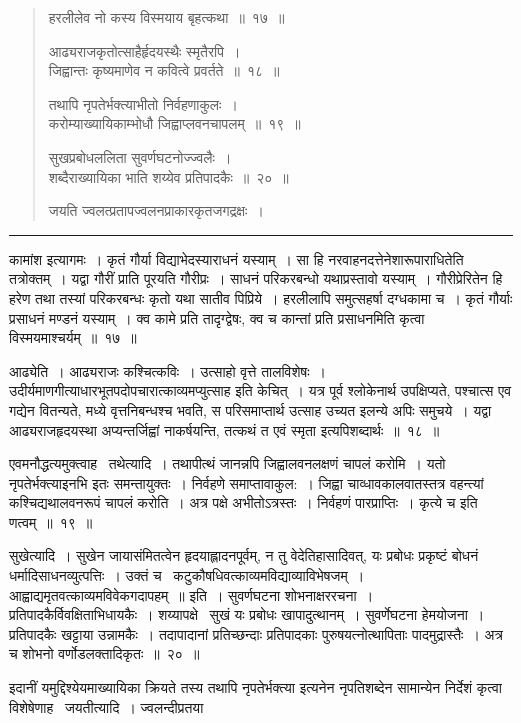 \documentclass[11pt, openany]{book}
\begin{document}
\newpage

\begin{quote}
{\ha हरलीलेव नो कस्य विस्मयाय बृहत्कथा~॥~१७~॥

आढ्यराजकृतोत्साहैर्हृदयस्थैः स्मृतैरपि~।\\
जिह्वान्तः कृष्यमाणेव न कवित्वे प्रवर्तते~॥~१८~॥

तथापि नृपतेर्भक्त्याभीतो निर्वहणाकुलः~।\\
करोम्याख्यायिकाम्भोधौ जिह्वाप्लवनचापलम्~॥~१९~॥

सुखप्रबोधललिता सुवर्णघटनोज्ज्वलैः~।\\
शब्दैराख्यायिका भाति शय्येव प्रतिपादकैः~॥~२०~॥

जयति ज्वलत्प्रतापज्वलनप्राकारकृतजगद्रक्षः~।}
\end{quote}

\hrule

\noindent
{\s कामांश इत्यागमः~। कृतं गौर्या विद्याभेदस्याराधनं यस्याम्~। सा हि नरवाहनदत्तेनेशारूपाराधितेति तत्रोक्तम्~। यद्वा गौरीं प्राति पूरयति गौरीप्रः~। साधनं परिकरबन्धो यथाप्रस्तावो यस्याम्~। गौरीप्रेरितेन हि हरेण तथा तस्यां परिकरबन्धः कृतो यथा सातीव पिप्रिये~। हरलीलापि समुत्सहर्षा दग्धकामा च~। कृतं गौर्याः प्रसाधनं मण्डनं यस्याम्~। क्व कामे प्रति तादृग्द्वेषः, क्व च कान्तां प्रति प्रसाधनमिति कृत्वा विस्मयमाश्चर्यम्~॥~१७~॥

{\qtt आढ्येति}~। आढ्यराजः कश्चित्कविः~। उत्साहो वृत्ते तालविशेषः~। उदीर्यमाणगीत्याधारभूतपदोपचारात्काव्यमप्युत्साह इति केचित्~। यत्र पूर्व श्लोकेनार्थ उपक्षिप्यते, पश्चात्स एव गद्येन वितन्यते, मध्ये वृत्तनिबन्धश्च भवति, स परिसमाप्तार्थ उत्साह उच्यत इलन्ये अपिः समुचये~। यद्वा आढ्यराजहृदयस्था अप्यन्तर्जिह्वां नाकर्षयन्ति, तत्कथं त एवं स्मृता इत्यपिशब्दार्थः~॥~१८~॥

एवमनौद्धत्यमुक्त्वाह \textendash\ {\qtt तथेत्यादि}~। तथापीत्थं जानन्नपि जिह्वालवनलक्षणं चापलं करोमि~। यतो नृपतेर्भक्त्याइनभि इतः समन्तायुक्तः~। निर्वहणे समाप्तावाकुल:~। जिह्वा चाव्धावकालवातस्तत्र वहन्त्यां कश्चिद्यथालवनरूपं चापलं करोति~। अत्र पक्षे अभीतोऽत्रस्तः~। निर्वहणं पारप्राप्तिः~। {\qt कृत्ये च} इति णत्वम्~॥~१९~॥

{\qtt सुखेत्यादि}~। सुखेन जायासंमितत्वेन हृदयाह्लादनपूर्वम्, न तु वेदेतिहासादिवत्, यः प्रबोधः प्रकृष्टं बोधनं धर्मादिसाधनव्युत्पत्तिः~। उक्तं च \textendash\ {\qt कटुकौषधिवत्काव्यमविद्याव्याविभेषजम्~। आह्वाद्यमृतवत्काव्यमविवेकगदापहम्~॥} इति~। सुवर्णघटना शोभनाक्षररचना~। प्रतिपादकैर्विवक्षिताभिधायकैः~। शय्यापक्षे \textendash\ सुखं यः प्रबोधः खापादुत्थानम्~। सुवर्णेघटना हेमयोजना~। प्रतिपादकैः खट्टाया उन्नामकैः~। तदापादानां प्रतिच्छन्दाः प्रतिपादकाः पुरुषयत्नोत्थापिताः पादमुद्रास्तैः~। अत्र च शोभनो वर्णोडलक्तादिकृतः~॥~२०~॥

इदानीं यमुद्दिश्येयमाख्यायिका क्रियते तस्य {\qt तथापि नृपतेर्भक्त्या} इत्यनेन नृपतिशब्देन सामान्येन निर्देशं कृत्वा विशेषेणाह \textendash\ {\qtt जयतीत्यादि}~। ज्वलन्दीप्रतया\textendash }
\end{document}
